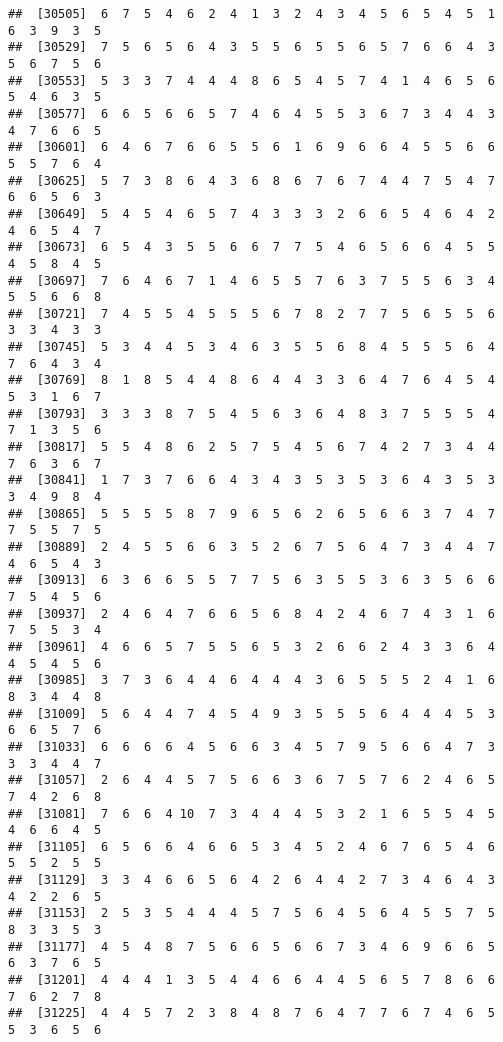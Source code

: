 \documentclass[
]{book}
\begin{document}
\begin{verbatim}
##  [30505]  6  7  5  4  6  2  4  1  3  2  4  3  4  5  6  5  4  5  1  6  3  9  3  5
##  [30529]  7  5  6  5  6  4  3  5  5  6  5  5  6  5  7  6  6  4  3  5  6  7  5  6
##  [30553]  5  3  3  7  4  4  4  8  6  5  4  5  7  4  1  4  6  5  6  5  4  6  3  5
##  [30577]  6  6  5  6  6  5  7  4  6  4  5  5  3  6  7  3  4  4  3  4  7  6  6  5
##  [30601]  6  4  6  7  6  6  5  5  6  1  6  9  6  6  4  5  5  6  6  5  5  7  6  4
##  [30625]  5  7  3  8  6  4  3  6  8  6  7  6  7  4  4  7  5  4  7  6  6  5  6  3
##  [30649]  5  4  5  4  6  5  7  4  3  3  3  2  6  6  5  4  6  4  2  4  6  5  4  7
##  [30673]  6  5  4  3  5  5  6  6  7  7  5  4  6  5  6  6  4  5  5  4  5  8  4  5
##  [30697]  7  6  4  6  7  1  4  6  5  5  7  6  3  7  5  5  6  3  4  5  5  6  6  8
##  [30721]  7  4  5  5  4  5  5  5  6  7  8  2  7  7  5  6  5  5  6  3  3  4  3  3
##  [30745]  5  3  4  4  5  3  4  6  3  5  5  6  8  4  5  5  5  6  4  7  6  4  3  4
##  [30769]  8  1  8  5  4  4  8  6  4  4  3  3  6  4  7  6  4  5  4  5  3  1  6  7
##  [30793]  3  3  3  8  7  5  4  5  6  3  6  4  8  3  7  5  5  5  4  7  1  3  5  6
##  [30817]  5  5  4  8  6  2  5  7  5  4  5  6  7  4  2  7  3  4  4  7  6  3  6  7
##  [30841]  1  7  3  7  6  6  4  3  4  3  5  3  5  3  6  4  3  5  3  3  4  9  8  4
##  [30865]  5  5  5  5  8  7  9  6  5  6  2  6  5  6  6  3  7  4  7  7  5  5  7  5
##  [30889]  2  4  5  5  6  6  3  5  2  6  7  5  6  4  7  3  4  4  7  4  6  5  4  3
##  [30913]  6  3  6  6  5  5  7  7  5  6  3  5  5  3  6  3  5  6  6  7  5  4  5  6
##  [30937]  2  4  6  4  7  6  6  5  6  8  4  2  4  6  7  4  3  1  6  7  5  5  3  4
##  [30961]  4  6  6  5  7  5  5  6  5  3  2  6  6  2  4  3  3  6  4  4  5  4  5  6
##  [30985]  3  7  3  6  4  4  6  4  4  4  3  6  5  5  5  2  4  1  6  8  3  4  4  8
##  [31009]  5  6  4  4  7  4  5  4  9  3  5  5  5  6  4  4  4  5  3  6  6  5  7  6
##  [31033]  6  6  6  6  4  5  6  6  3  4  5  7  9  5  6  6  4  7  3  3  3  4  4  7
##  [31057]  2  6  4  4  5  7  5  6  6  3  6  7  5  7  6  2  4  6  5  7  4  2  6  8
##  [31081]  7  6  6  4 10  7  3  4  4  4  5  3  2  1  6  5  5  4  5  4  6  6  4  5
##  [31105]  6  5  6  6  4  6  6  5  3  4  5  2  4  6  7  6  5  4  6  5  5  2  5  5
##  [31129]  3  3  4  6  6  5  6  4  2  6  4  4  2  7  3  4  6  4  3  4  2  2  6  5
##  [31153]  2  5  3  5  4  4  4  5  7  5  6  4  5  6  4  5  5  7  5  8  3  3  5  3
##  [31177]  4  5  4  8  7  5  6  6  5  6  6  7  3  4  6  9  6  6  5  6  3  7  6  5
##  [31201]  4  4  4  1  3  5  4  4  6  6  4  4  5  6  5  7  8  6  6  7  6  2  7  8
##  [31225]  4  4  5  7  2  3  8  4  8  7  6  4  7  7  6  7  4  6  5  5  3  6  5  6

\end{verbatim}
\end{document}
